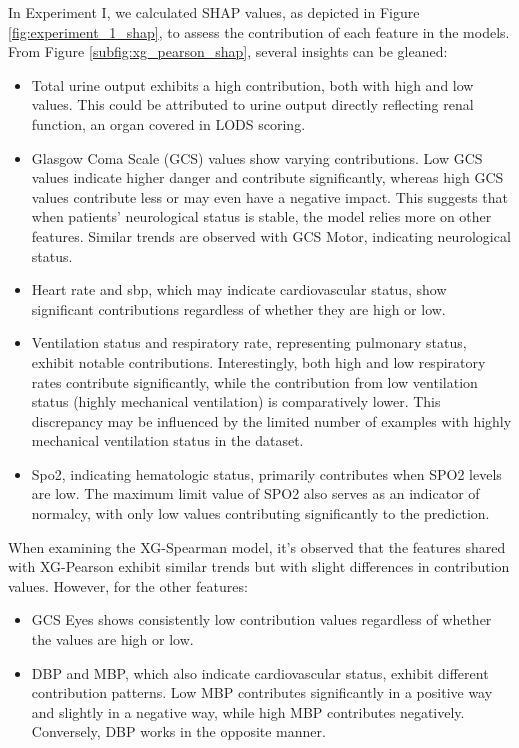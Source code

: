 \documentclass[12pt,a4paper,english
]{tunithesis}
\begin{document}
In Experiment I, we calculated SHAP values, as depicted in Figure \ref{fig:experiment_1_shap}, to assess the contribution of each feature in the models. From Figure \ref{subfig:xg_pearson_shap}, several insights can be gleaned:
\begin{itemize}
\item Total urine output exhibits a high contribution, both with high and low values. This could be attributed to urine output directly reflecting renal function, an organ covered in LODS scoring.
\item Glasgow Coma Scale (GCS) values show varying contributions. Low GCS values indicate higher danger and contribute significantly, whereas high GCS values contribute less or may even have a negative impact. This suggests that when patients' neurological status is stable, the model relies more on other features. 
Similar trends are observed with GCS Motor, indicating neurological status.
\item Heart rate and sbp, which may indicate cardiovascular status, show significant contributions regardless of whether they are high or low.
\item Ventilation status and respiratory rate, representing pulmonary status, exhibit notable contributions. Interestingly, both high and low respiratory rates contribute significantly, while the contribution from low ventilation status (highly mechanical ventilation) is comparatively lower. This discrepancy may be influenced by the limited number of examples with highly mechanical ventilation status in the dataset.
\item Spo2, indicating hematologic status, primarily contributes when SPO2 levels are low. The maximum limit value of SPO2 also serves as an indicator of normalcy, with only low values contributing significantly to the prediction.
\end{itemize}

When examining the XG-Spearman model, it's observed that the features shared with XG-Pearson exhibit similar trends but with slight differences in contribution values. However, for the other features:
\begin{itemize}
\item GCS Eyes shows consistently low contribution values regardless of whether the values are high or low.
\item DBP and MBP, which also indicate cardiovascular status, exhibit different contribution patterns. Low MBP contributes significantly in a positive way and slightly in a negative way, while high MBP contributes negatively. Conversely, DBP works in the opposite manner.
\end{itemize}
\end{document}
